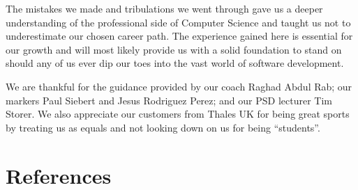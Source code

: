 \documentclass{l3proj}
\begin{document}
The mistakes we made and tribulations we went through gave us a deeper understanding of the professional side of Computer Science and taught us not to underestimate our chosen career path. The experience gained here is essential for our growth and will most likely provide us with a solid foundation to stand on should any of us ever dip our toes into the vast world of software development.

We are thankful for the guidance provided by our coach Raghad Abdul Rab; our markers Paul Siebert and Jesus Rodriguez Perez; and our PSD lecturer Tim Storer. We also appreciate our customers from Thales UK for being great sports by treating us as equals and not looking down on us for being “students”.

\newpage

\section{References}




\end{document}
